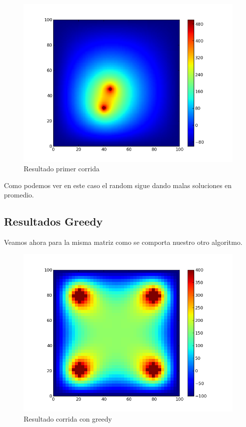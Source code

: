 \newpage

\begin{figure}[htb]
\begin{center}
\includegraphics[scale=0.40]{imagenes/random_6.png} 
\caption{Resultado primer corrida} 
\end{center}
\end{figure}

Como podemos ver en este caso el random sigue dando malas soluciones en promedio. 


\subsection{Resultados Greedy}

Veamos ahora para la misma matriz como se comporta nuestro otro algoritmo. 


\begin{figure}[htb]
\begin{center}
\includegraphics[scale=0.50]{imagenes/random_2.png} 
\caption{Resultado corrida con greedy} 
\end{center}
\end{figure}
\newpage

